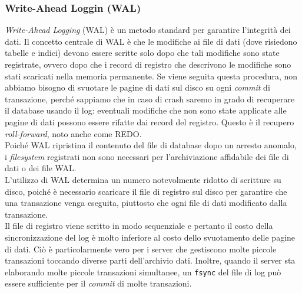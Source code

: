 \item
\subsubsection{Write-Ahead Loggin (WAL)}
\textit{Write-Ahead Logging} (WAL) \`{e} un metodo standard per garantire l'integrit\`{a} dei dati. Il concetto centrale di WAL \`{e} che le modifiche ai file di dati (dove risiedono tabelle e indici) devono essere scritte solo dopo che tali modifiche sono state registrate, ovvero dopo che i record di registro che descrivono le modifiche sono stati scaricati nella memoria permanente. Se viene seguita questa procedura, non abbiamo bisogno di svuotare le pagine di dati sul disco su ogni \textit{commit} di transazione, perch\'{e} sappiamo che in caso di crash saremo in grado di recuperare il database usando il log: eventuali modifiche che non sono state applicate alle pagine di dati possono essere rifatte dai record del registro. Questo \`{e} il recupero \textit{roll-forward}, noto anche come REDO.\\

Poich\'{e} WAL ripristina il contenuto del file di database dopo un arresto anomalo, i \textit{filesystem} registrati non sono necessari per l'archiviazione affidabile dei file di dati o dei file WAL. \\
L'utilizzo di WAL determina un numero notevolmente ridotto di scritture su disco, poich\'{e} \`{e} necessario scaricare il file di registro sul disco per garantire che una transazione venga eseguita, piuttosto che ogni file di dati modificato dalla transazione. \\
Il file di registro viene scritto in modo sequenziale e pertanto il costo della sincronizzazione del log \`{e} molto inferiore al costo dello svuotamento delle pagine di dati. Ci\`{o} \`{e} particolarmente vero per i server che gestiscono molte piccole transazioni toccando diverse parti dell'archivio dati. Inoltre, quando il server sta elaborando molte piccole transazioni simultanee, un \verb"fsync" del file di log pu\`{o} essere sufficiente per il \textit{commit} di molte transazioni.\cite{etichetta15}

